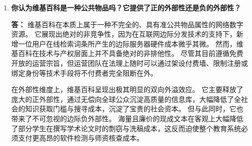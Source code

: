 \begin{enumerate}[label=\textbf{\arabic*.}, leftmargin=*]
		\item \textbf{你认为维基百科是一种公共物品吗？它提供了正的外部性还是负的外部性？}
		
		\textbf{答：} 维基百科在本质上属于一种不完全的、具有准公共物品属性的网络数字资源。
		它展现出绝对的非竞争性，因为在互联网边际分发技术的支持下，新增一位用户在线检索词条所产生的边际服务器硬件成本微乎其微。
		然而，维基百科在技术与产权层面上并不具备绝对的非排他性。
		尽管其目前遵循免费开放的运营宗旨，但运营团队在法理上随时可以通过架设付费墙、限制注册或绑定身份等技术手段将不付费者完全阻断在外。
		
		在外部性维度上，维基百科呈现出极其明显的双向外溢效应。
		它主要释放了庞大的正外部性，通过无偿向全球公众沉淀高质量的信息库，大幅降低了全社会的知识获取门槛与搜寻成本，沉淀了宝贵的社会资本。
		但与此同时，它也带来了不可忽视的边际负外部性。
		海量且廉价的现成文本在客观上大幅降低了部分学生在撰写学术论文时的剽窃与洗稿成本，这反而迫使整个教育系统必须支付更高昂的软件检测与师资核查成本。
	\end{enumerate}
	\newpage

